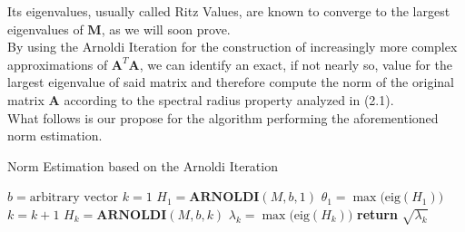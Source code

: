 \documentclass{article}
\numberwithin{equation}{section}
\begin{document}
Its eigenvalues, usually called Ritz Values, are known to converge to the largest eigenvalues of $\boldsymbol{M}$, as we will soon prove.\\
By using the Arnoldi Iteration for the construction of increasingly more complex approximations of $\boldsymbol{A}^T\boldsymbol{A}$, we can identify an exact, if not nearly so, value for the largest eigenvalue of said matrix and therefore compute the norm of the original matrix $\boldsymbol{A}$ according to the spectral radius property analyzed in (2.1).\\
What follows is our propose for the algorithm performing the aforementioned norm estimation. 
\begin{algorithm}
\caption{Norm Estimation based on the Arnoldi Iteration}\label{alg:cap}
\begin{algorithmic}
\State $b = \text{arbitrary vector}$
\State $k=1$
\State $H_1 = \textbf{ARNOLDI}(M,b,1)$
\State $\theta_1 = \max{(\text{eig}(H_1)})$
\Repeat
    \State $k = k +1$
    \State $H_k = \textbf{ARNOLDI}(M,b,k)$
    \State $\lambda_k = \max{(\text{eig}(H_k)})$ 
 
\State \textbf{return} $\sqrt{\lambda_k}$
\EndProcedure
\end{algorithmic}
\end{algorithm}
\end{document}
